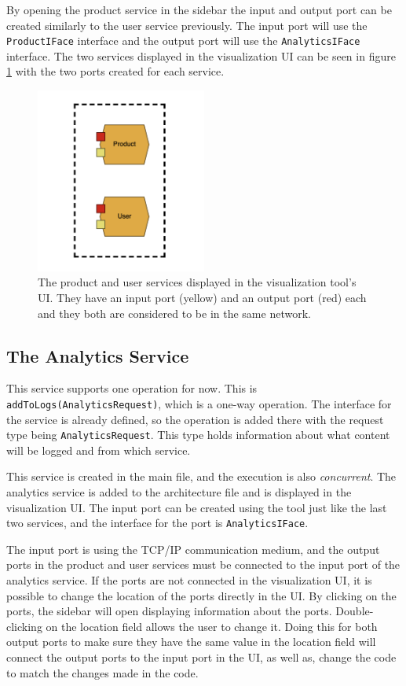 By opening the product service in the sidebar the input and output port can be created similarly to the user service previously. The input port will use the \texttt{ProductIFace} interface and the output port will use the \texttt{AnalyticsIFace} interface.
The two services displayed in the visualization UI can be seen in figure \ref*{figure:jv_product_and_user} with the two ports created for each service.
\begin{figure}[h!]
    \center
    \includegraphics[width=0.5\textwidth]{figures/jv_product_and_user.png}
    \caption{The product and user services displayed in the visualization tool's UI. They have an input port (yellow) and an output port (red) each and they both are considered to be in the same network.}
    \label{figure:jv_product_and_user}
\end{figure}

\subsection{The Analytics Service}
This service supports one operation for now. This is \texttt{addToLogs(AnalyticsRequest)}, which is a one-way operation. The interface for the service is already defined, so the operation is added there with the request type being \texttt{AnalyticsRequest}. This type holds information about what content will be logged and from which service.

This service is created in the main file, and the execution is also \textit{concurrent}. The analytics service is added to the architecture file and is displayed in the visualization UI.
The input port can be created using the tool just like the last two services, and the interface for the
port is \texttt{AnalyticsIFace}.

The input port is using the TCP/IP communication medium, and the output ports in the product and user services must be connected to the input port of the analytics service.
If the ports are not connected in the visualization UI, it is possible to change the location of the ports directly in the UI.
By clicking on the ports, the sidebar will open displaying information about the ports. Double-clicking on the location field allows the user to change it.
Doing this for both output ports to make sure they have the same value in the location field will connect the output ports to the input port in the UI, as well as, change the code to match the changes made in the code.

